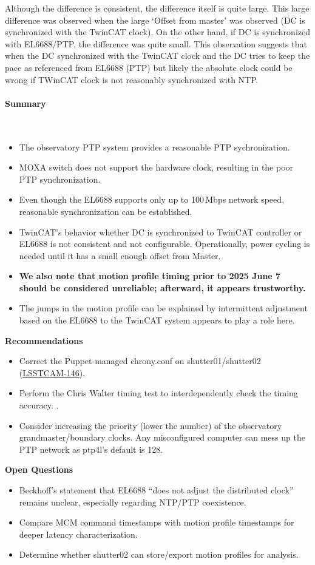 Although the difference is consistent, the difference itself is quite large. This large difference was observed when the large `Offset from master' was observed (DC is synchronized with the TwinCAT clock). On the other hand, if DC is synchronized with EL6688/PTP, the difference was quite small. This observation suggests that when the DC synchronized with the TwinCAT clock and the DC tries to keep the pace as referenced from EL6688 (PTP) but likely the absolute clock could be wrong if TWinCAT clock is not reasonably synchronized with NTP.

\paragraph{Summary}\
\begin{itemize}
\item The observatory PTP system provides a reasonable PTP sychronization.
\item MOXA switch does not support the hardware clock, resulting in the poor PTP synchronization. 
\item Even though the EL6688 supports only up to 100\,Mbps network speed, reasonable synchronization can be established.
\item TwinCAT's behavior whether DC is synchronized to TwinCAT controller or EL6688 is not consistent and not configurable. Operationally, power cycling is needed until it has a small enough offset from Master.
\item {\bf We also note that motion profile timing prior to 2025 June 7 should be considered unreliable; afterward, it appears trustworthy.} 
\item The jumps in the motion profile can be explained by intermittent adjustment based on the EL6688 to the TwinCAT system appears to play a role here. 
\end{itemize}

\textbf{Recommendations}\
\begin{itemize}
\item Correct the Puppet-managed chrony.conf on shutter01/shutter02 (\href{https://rubinobs.atlassian.net/browse/LSSTCAM-146}{LSSTCAM-146}).
\item Perform the Chris Walter timing test to interdependently check the timing accuracy. \citep{SITCOMTN-136}.
\item Consider increasing the priority (lower the number) of the observatory grandmaster/boundary clocks. Any misconfigured computer can mess up the PTP network as ptp4l's default is 128.
\end{itemize}

 
\textbf{Open Questions}\
\begin{itemize}
\item Beckhoff's statement that EL6688 ``does not adjust the distributed clock'' remains unclear, especially regarding NTP/PTP coexistence.
\item Compare MCM command timestamps with motion profile timestamps for deeper latency characterization.
\item Determine whether shutter02 can store/export motion profiles for analysis.
\end{itemize}

